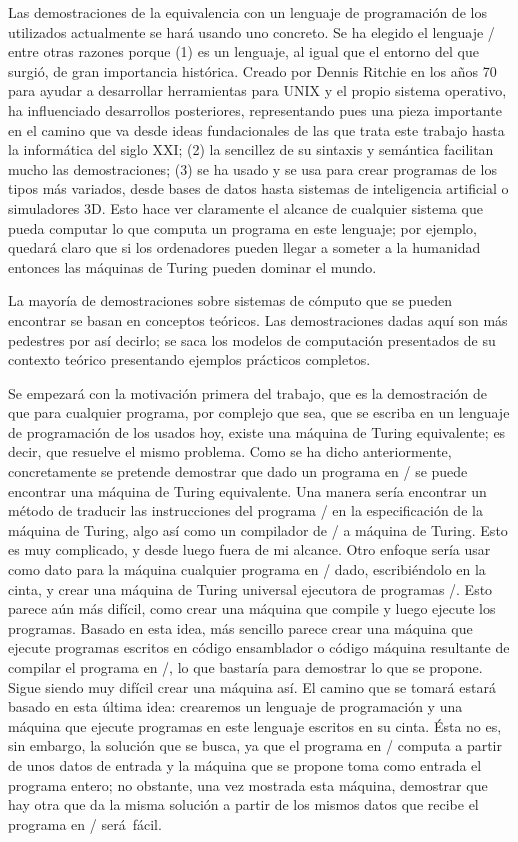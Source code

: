 %
Las demostraciones de la equivalencia con un lenguaje de programación de los utilizados actualmente
se hará usando uno concreto. Se ha elegido el lenguaje \C/ entre otras razones porque (1) es un
lenguaje, al igual que el entorno del que surgió, de gran importancia histórica. Creado por Dennis
Ritchie en los años 70 para ayudar a desarrollar herramientas para UNIX y el propio sistema
operativo, ha influenciado desarrollos posteriores, representando pues una pieza importante en el
camino que va desde ideas fundacionales de las que trata este trabajo hasta la informática del siglo
XXI; (2) la sencillez de su sintaxis y semántica faci\-litan mucho las demostraciones; (3) se ha usado
y se usa para crear programas de los tipos más variados, desde bases de datos hasta sistemas de
inteligencia artificial o simuladores 3D. Esto hace ver claramente el alcance de cualquier sistema
que pueda computar lo que computa un programa en este lenguaje; por ejemplo, quedará claro que si
los ordenadores pueden llegar a someter a la humanidad entonces las máquinas de Turing pueden
dominar el mundo.

%
La mayoría de demostraciones sobre sistemas de cómputo que se pueden encontrar se basan en conceptos
teóricos. Las demostraciones dadas aquí son más pedestres por así decirlo; se saca los modelos de
computación presentados de su contexto teórico presentando ejemplos prácticos completos.

Se empezará con la motivación primera del trabajo, que es la demostración de que para cualquier
programa, por complejo que sea, que se escriba en un lenguaje de programación de los usados hoy,
existe una máquina de Turing equi\-valente; es decir, que resuelve el mismo problema. Como se ha
dicho anteriormente, con\-cretamente se pretende demostrar que dado un programa en \C/ se puede
encontrar una máquina de Turing equivalente. Una manera sería encontrar un método de traducir las
instrucciones del programa \C/ en la especificación de la máquina de Turing, algo así como un
compilador de \C/ a máquina de Turing. Esto es muy complicado, y desde luego fuera de mi
alcance. Otro enfoque sería usar como dato para la máquina cualquier programa en \C/ dado,
escribiéndolo en la cinta, y crear una máquina de Turing universal ejecutora de programas \C/. Esto
parece aún más difícil, como crear una máquina que compile y luego ejecute los programas. Basado en
esta idea, más sencillo parece crear una máquina que ejecute programas escritos en código
ensamblador o código máquina resultante de compilar el programa en \C/, lo que bastaría para
demostrar lo que se propone. Sigue siendo muy difícil crear una máquina así. El camino que se tomará
estará basado en esta última idea: crearemos un lenguaje de programación y una máquina que ejecute
programas en este lenguaje escritos en su cinta. Ésta no es, sin embargo, la solución que se busca,
ya que el programa en \C/ computa a partir de unos datos de entrada y la máquina que se propone toma
como entrada el programa entero; no obstante, una vez mostrada esta máquina, demostrar que hay otra
que da la misma solución a partir de los mismos datos que recibe el programa en \C/ será\nobreak\
fácil.

